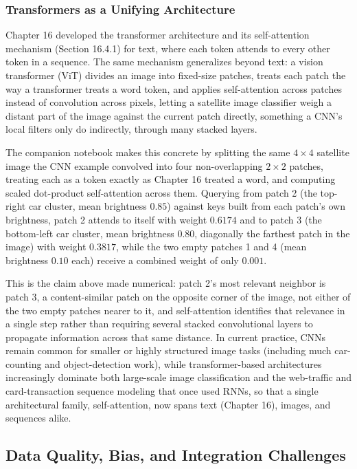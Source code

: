 \documentclass[../ai_in_finance]{subfiles}
\begin{document}
\subsubsection*{Transformers as a Unifying Architecture}

Chapter 16 developed the transformer architecture and its self-attention mechanism (Section 16.4.1) for text, where each token attends to every other token in a sequence. The same mechanism generalizes beyond text: a vision transformer (ViT) divides an image into fixed-size patches, treats each patch the way a transformer treats a word token, and applies self-attention across patches instead of convolution across pixels, letting a satellite image classifier weigh a distant part of the image against the current patch directly, something a CNN's local filters only do indirectly, through many stacked layers.

The companion notebook makes this concrete by splitting the same $4\times4$ satellite image the CNN example convolved into four non-overlapping $2\times2$ patches, treating each as a token exactly as Chapter 16 treated a word, and computing scaled dot-product self-attention across them. Querying from patch 2 (the top-right car cluster, mean brightness $0.85$) against keys built from each patch's own brightness, patch 2 attends to itself with weight $0.6174$ and to patch 3 (the bottom-left car cluster, mean brightness $0.80$, diagonally the farthest patch in the image) with weight $0.3817$, while the two empty patches 1 and 4 (mean brightness $0.10$ each) receive a combined weight of only $0.001$.

This is the claim above made numerical: patch 2's most relevant neighbor is patch 3, a content-similar patch on the opposite corner of the image, not either of the two empty patches nearer to it, and self-attention identifies that relevance in a single step rather than requiring several stacked convolutional layers to propagate information across that same distance. In current practice, CNNs remain common for smaller or highly structured image tasks (including much car-counting and object-detection work), while transformer-based architectures increasingly dominate both large-scale image classification and the web-traffic and card-transaction sequence modeling that once used RNNs, so that a single architectural family, self-attention, now spans text (Chapter 16), images, and sequences alike.

\subsection{Data Quality, Bias, and Integration Challenges}
\label{sec:alt-data-quality}
\end{document}
